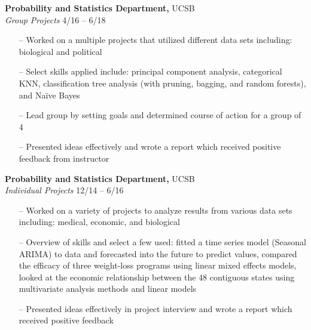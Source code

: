 \begin{vitae}
\textbf{Probability and Statistics Department,} UCSB	 \\
\textit{Group Projects}
\hfill				         
4/16 – 6/18
\vspace{-\topsep}
\begin{itemize}\setlength{\parskip}{0pt}
\setlength{\itemsep}{0pt plus 1pt}
\setlength\itemsep{0pt plus 1pt}
\item[--] Worked on a multiple projects that utilized different data sets including: biological and political
\item[--] Select skills applied include: principal component analysis, categorical KNN, classification tree analysis (with pruning, bagging, and random forests), and Naïve Bayes 
\item[--] Lead group by setting goals and determined course of action for a group of 4
\item[--] Presented ideas effectively and wrote a report which received positive feedback from instructor
\end{itemize}
\vspace{-\topsep}

\textbf{Probability and Statistics Department,} UCSB	 \\
\textit{Individual Projects}
\hfill
12/14 – 6/16
\vspace{-\topsep}
\begin{itemize}
\setlength{\parskip}{0pt}
\setlength{\itemsep}{0pt plus 1pt}
\item[--] Worked on a variety of projects to analyze results from various data sets including: medical, economic, and biological
\item[--] Overview of skills and select a few used: fitted a time series model (Seasonal ARIMA) to data and forecasted into the future to predict values, compared the efficacy of three weight-loss programs using linear mixed effects models, looked at the economic relationship between the 48 contiguous states using multivariate analysis methods and linear models
\item[--] Presented ideas effectively in project interview and wrote a report which received positive feedback 
\end{itemize}
\vspace{-\topsep}
 

\end{vitae}
